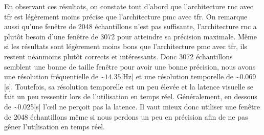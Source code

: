 En observant ces résultats, on constate tout d'abord que l'architecture \gls{rnc} avec \gls{tfr} est légèrement moins précise que l'architecture \gls{pmc} avec \gls{tfr}. On remarque aussi qu'une fenêtre de 2048 échantillons n'est pas suffisante, l'architecture \gls{rnc} a plutôt besoin d'une fenêtre de 3072 pour atteindre sa précision maximale. Même si les résultats sont légèrement moins bons que l'architecture \gls{pmc} avec \gls{tfr}, ils restent néanmoins plutôt corrects et intéressants. Donc 3072 échantillons semblent une bonne de taille fenêtre pour avoir une bonne précision, nous avons une résolution fréquentielle de \textasciitilde$14.35$[Hz] et une résolution temporelle de \textasciitilde$0.069$[s]. Toutefois, sa résolution temporelle est un peu élevée et la latence visuelle se fait un peu ressentir lors de l'utilisation en temps réel. Généralement, en dessous de \textasciitilde0.025[s] l'œil ne perçoit pas la latence. Il vaut mieux donc utiliser une fenêtre de 2048 échantillons même si nous perdons un peu en précision afin de ne pas gêner l'utilisation en temps réel.

\begin{table}[H]
\end{table}

